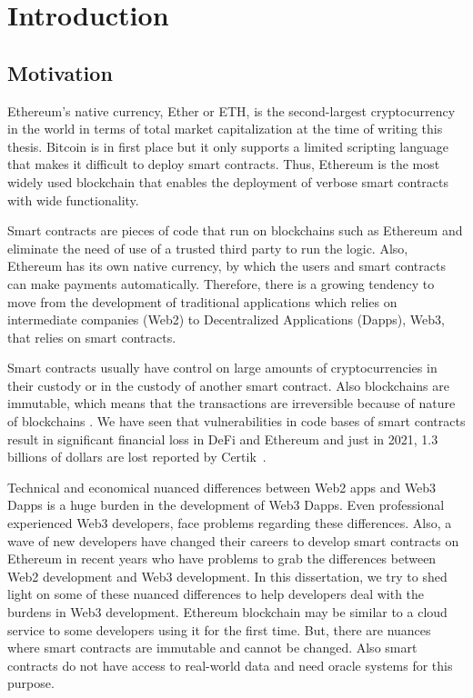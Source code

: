 \chapter{Introduction}


\section{Motivation}
Ethereum's native currency, Ether or ETH, is the second-largest cryptocurrency in the world in terms of total market capitalization at the time of writing this thesis. Bitcoin is in first place but it only supports a limited scripting language that makes it difficult to deploy smart contracts. Thus, Ethereum is the most widely used blockchain that enables the deployment of verbose smart contracts with wide functionality.

Smart contracts are pieces of code that run on blockchains such as Ethereum and eliminate the need of use of a trusted third party to run the logic. Also, Ethereum has its own native currency, by which the users and smart contracts can make payments automatically.
Therefore, there is a growing tendency to move from the development of traditional applications which relies on intermediate companies (Web2) to Decentralized Applications (Dapps), Web3, that relies on smart contracts. 

Smart contracts usually have control on large amounts of cryptocurrencies in their custody or in the custody of another smart contract. Also blockchains are immutable, which means that the transactions are irreversible because of nature of blockchains . 
We have seen that vulnerabilities in code bases of smart contracts result in significant financial loss in DeFi and Ethereum and just in 2021, 1.3 billions of dollars are lost reported by Certik~\cite{certikReport}.


Technical and economical nuanced differences between Web2 apps and Web3 Dapps is a huge burden in the development of Web3 Dapps. Even professional experienced Web3 developers, face problems regarding these differences. Also, a wave of new developers have changed their careers to develop smart contracts on Ethereum in recent years who have problems to grab the differences between Web2 development and Web3 development. In this dissertation, we try to shed light on some of these nuanced differences to help developers deal with the burdens in Web3 development. Ethereum blockchain may be similar to a cloud service to some developers using it for the first time. But, there are nuances where smart contracts are immutable and cannot be changed. Also smart contracts do not have access to real-world data and need oracle systems for this purpose.


